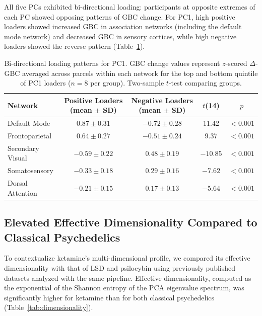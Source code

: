 \documentclass[11pt]{article}
\begin{document}
All five PCs exhibited bi-directional loading: participants at opposite extremes of each PC showed opposing patterns of GBC change. For PC1, high positive loaders showed increased GBC in association networks (including the default mode network) and decreased GBC in sensory cortices, while high negative loaders showed the reverse pattern (Table~\ref{tab:bidirectional}).

\begin{table}[H]
\centering
\caption{Bi-directional loading patterns for PC1. GBC change values represent $z$-scored $\Delta$-GBC averaged across parcels within each network for the top and bottom quintile of PC1 loaders ($n = 8$ per group). Two-sample $t$-test comparing groups.}
\label{tab:bidirectional}
\begin{tabular}{lcccc}
\toprule
\textbf{Network} & \textbf{Positive Loaders (mean $\pm$ SD)} & \textbf{Negative Loaders (mean $\pm$ SD)} & \textbf{$t$(14)} & \textbf{$p$} \\
\midrule
Default Mode & $0.87 \pm 0.31$ & $-0.72 \pm 0.28$ & 11.42 & $< 0.001$ \\
Frontoparietal & $0.64 \pm 0.27$ & $-0.51 \pm 0.24$ & 9.37 & $< 0.001$ \\
Secondary Visual & $-0.59 \pm 0.22$ & $0.48 \pm 0.19$ & $-10.85$ & $< 0.001$ \\
Somatosensory & $-0.33 \pm 0.18$ & $0.29 \pm 0.16$ & $-7.62$ & $< 0.001$ \\
Dorsal Attention & $-0.21 \pm 0.15$ & $0.17 \pm 0.13$ & $-5.64$ & $< 0.001$ \\
\bottomrule
\end{tabular}
\end{table}

\subsection{Elevated Effective Dimensionality Compared to Classical Psychedelics}

To contextualize ketamine's multi-dimensional profile, we compared its effective dimensionality with that of LSD and psilocybin using previously published datasets analyzed with the same pipeline. Effective dimensionality, computed as the exponential of the Shannon entropy of the PCA eigenvalue spectrum, was significantly higher for ketamine than for both classical psychedelics (Table~\ref{tab:dimensionality}).
\end{document}
